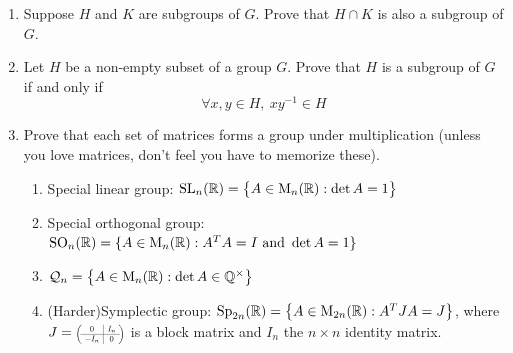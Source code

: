 \begin{exercises}
\begin{enumerate}
	  
	  
	  
		\item Suppose $H$ and $K$ are subgroups of $G$. Prove that $H\cap K$ is also a subgroup of $G$.
	   
	   
		\item Let $H$ be a non-empty subset of a group $G$. Prove that $H$ is a subgroup of $G$ if and only if
	  \[
	  	\forall x,y\in H,\ xy^{-1}\in H
	  \]
	  
	  
	  \item\label{exs:subgpmatrix} Prove that each set of matrices forms a group under multiplication (unless you love matrices, don't feel you have to memorize these).
	  \begin{enumerate}
	    \item Special linear group: $\mathrm{SL}_n(\mathbb{R})=\bigl\{A\in \mathrm{M}_n(\mathbb{R}):\det A=1\bigr\}$
	    
	    \item Special orthogonal group: $\mathrm{SO}_n(\mathbb{R})=\{A\in\mathrm{M}_n(\mathbb{R}):A^TA=I\text{ and }\det A=1\}$
	    
	    \item $\mathcal Q_n=\bigl\{A\in \mathrm{M}_n(\mathbb{R}):\det A\in\mathbb{Q}^\times\bigr\}$
	    
	    \item (Harder)\lstsp Symplectic group: $\mathrm{Sp}_{2n}(\mathbb{R})=\bigl\{A\in \mathrm{M}_{2n}(\mathbb{R}):A^TJA=J\bigr\}$, where $J=\scalebox{0.6}{$\left(\!
	    \begin{array}{c|c}
	    	0&I_n\\
	    	\hline -I_n&0
	    \end{array}
	    \!\right)$}$ is a block matrix and $I_n$ the $n\times n$ identity matrix.
	    

\end{enumerate}
\end{enumerate}
\end{exercises}
